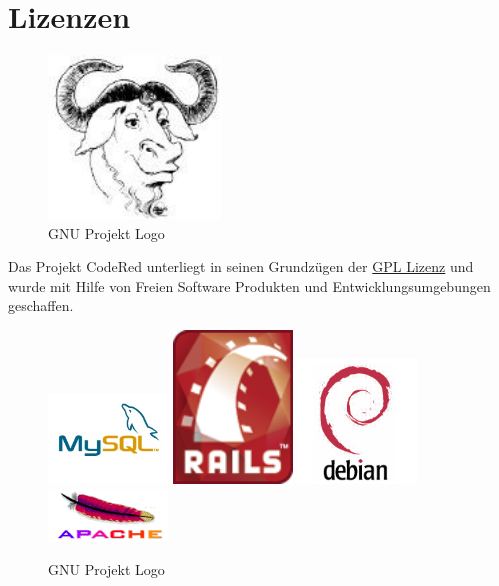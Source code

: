 \chapter{Lizenzen}  %
\label{chapter:Lizenzen}  %

\begin{figure}[h]
\begin{center}
   \includegraphics[width=130pt]{../bilder/gnu-head-sm.jpg}
   \caption{GNU Projekt Logo}
   \label{GPL Lizenz}
\end{center}
\end{figure}
Das Projekt CodeRed unterliegt in seinen Grundzügen der \href{http://de.wikipedia.org/wiki/GPL}{GPL Lizenz} und wurde mit Hilfe von Freien Software Produkten und Entwicklungsumgebungen geschaffen.
\begin{figure}[h]
\begin{center}
   \includegraphics[width=90pt]{../bilder/mysql.jpg}
   \includegraphics[width=90pt]{../bilder/rails.png}
   \includegraphics[width=90pt]{../bilder/debian.png}
   \includegraphics[width=90pt]{../bilder/apache.png}
   \caption{GNU Projekt Logo}
   \label{GPL Lizenz}
\end{center}
\end{figure}